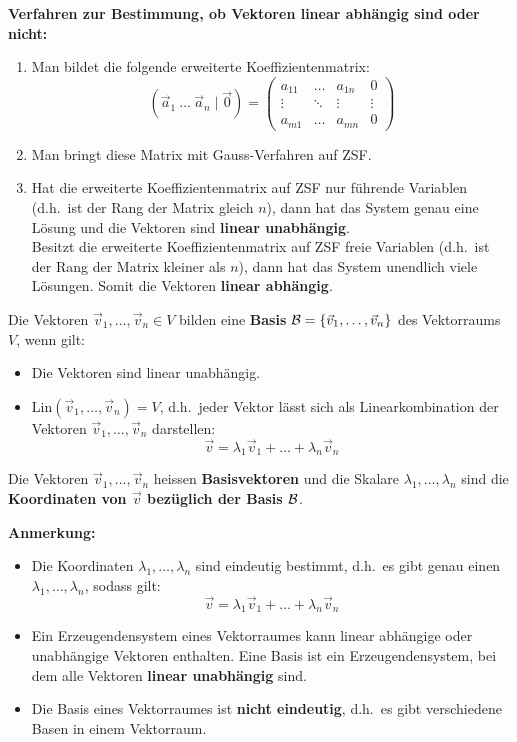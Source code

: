 \textbf{Verfahren zur Bestimmung, ob Vektoren linear abhängig sind oder nicht:}
\begin{enumerate}
    \item Man bildet die folgende erweiterte Koeffizientenmatrix:
    \[(\vec{a}_1 \ \dots \ \vec{a}_n \mid \vec{0}) = \left(
    \begin{array}{ccc|c}
        a_{11} & \ldots & a_{1n} & 0      \\
        \vdots & \ddots & \vdots & \vdots \\
        a_{m1} & \ldots & a_{mn} & 0
    \end{array}
    \right)\]
    \item Man bringt diese Matrix mit Gauss-Verfahren auf ZSF.\
    \item Hat die erweiterte Koeffizientenmatrix auf ZSF nur führende Variablen (d.h.\ ist der Rang der Matrix gleich $n$), dann hat das System genau eine Lösung und die Vektoren sind \textbf{linear unabhängig}.\\
    Besitzt die erweiterte Koeffizientenmatrix auf ZSF freie Variablen (d.h.\ ist der Rang der Matrix kleiner als $n$), dann hat das System unendlich viele Lösungen.
    Somit die Vektoren \textbf{linear abhängig}.
\end{enumerate}


Die Vektoren $\vec{v}_1, \dots, \vec{v}_n \in V$ bilden eine \textbf{Basis} $\mathcal{B} = \{ \vec{v}_1, \dots, \vec{v}_n \}$ des Vektorraums $V$, wenn gilt:
\begin{itemize}
    \item Die Vektoren sind linear unabhängig.
    \item $\text{Lin}(\vec{v}_1, \dots, \vec{v}_n) = V$, d.h.\ jeder Vektor lässt sich als Linearkombination der Vektoren $\vec{v}_1, \dots, \vec{v}_n$ darstellen: \[\vec{v} = \lambda_1 \vec{v}_1 + \dots + \lambda_n \vec{v}_n\]
\end{itemize}
Die Vektoren $\vec{v}_1, \dots, \vec{v}_n$ heissen \textbf{Basisvektoren} und die Skalare $\lambda_1, \dots, \lambda_n$ sind die \textbf{Koordinaten von $\vec{v}$ bezüglich der Basis $\mathcal{B}$}.

\textbf{Anmerkung:}
\begin{itemize}
    \item Die Koordinaten $\lambda_1, \dots, \lambda_n$ sind eindeutig bestimmt, d.h.\ es gibt genau einen $\lambda_1, \dots, \lambda_n$, sodass gilt: \[\vec{v} = \lambda_1 \vec{v}_1 + \dots + \lambda_n \vec{v}_n\]
    \item Ein Erzeugendensystem eines Vektorraumes kann linear abhängige oder unabhängige Vektoren enthalten.
    Eine Basis ist ein Erzeugendensystem, bei dem alle Vektoren \textbf{linear unabhängig} sind.
    \item Die Basis eines Vektorraumes ist \textbf{nicht eindeutig}, d.h.\ es gibt verschiedene Basen in einem Vektorraum.
\end{itemize}

